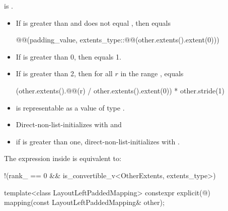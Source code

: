 \begin{itemdescr}
\pnum
\constraints
{} is .

\pnum
\expects
\begin{itemize}
\item
If  is greater than  and
 does not equal ,
then  equals
\begin{codeblock}
@@(padding_value,
                        extents_type::@@(other.extents().extent(0)))
\end{codeblock}
\item
If  is greater than 0,
then  equals 1.
\item
If  is greater than 2,
then for all $r$ in the range ,
 equals
\begin{codeblock}
(other.extents().@@(r) / other.extents().extent(0)) * other.stride(1)
\end{codeblock}
\item
{} is representable as
a value of type .
\end{itemize}

\pnum
\effects
\begin{itemize}
\item
Direct-non-list-initializes  with  and
\item
if  is greater than one,
direct-non-list-initializes  with
.
\end{itemize}

\pnum
\remarks
The expression inside  is equivalent to:
\begin{codeblock}
!(rank_ == 0 && is_convertible_v<OtherExtents, extents_type>)
\end{codeblock}
\end{itemdescr}

%
\begin{itemdecl}
template<class LayoutLeftPaddedMapping>
  constexpr explicit(@\seebelow@)
    mapping(const LayoutLeftPaddedMapping& other);
\end{itemdecl}

